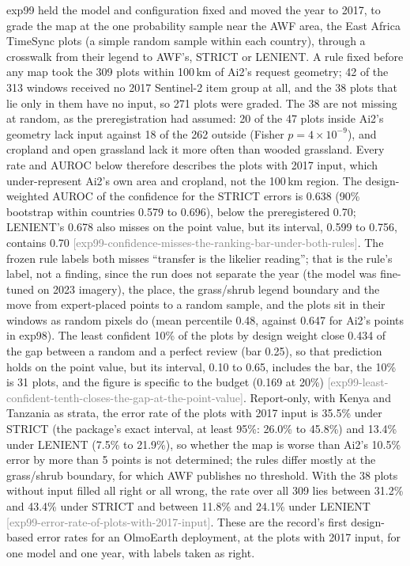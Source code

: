 \documentclass[11pt,a4paper]{article}
\newcommand{\claim}[1]{{\scriptsize\textsf{\textcolor{gray}{[#1]}}}}
\begin{document}
exp99 held the model and configuration fixed and moved the year to 2017, to grade the map at the one probability
sample near the AWF area, the East Africa TimeSync plots (a simple random sample within each country), through a
crosswalk from their legend to AWF's, STRICT or LENIENT. A rule fixed before any map took the 309 plots within 100\,km
of Ai2's request geometry; 42 of the 313 windows received no 2017 Sentinel-2 item group at all, and the 38 plots that
lie only in them have no input, so 271 plots were graded. The 38 are not missing at random, as the preregistration had assumed: 20 of the 47 plots inside Ai2's geometry
lack input against 18 of the 262 outside (Fisher $p = 4\times10^{-9}$), and cropland and open grassland lack it more
often than wooded grassland. Every rate and AUROC below therefore describes the plots with 2017 input, which under-represent Ai2's own area
and cropland, not the 100\,km region. The design-weighted AUROC of the confidence for the STRICT errors is 0.638 (90\%
bootstrap within countries 0.579 to 0.696), below the preregistered 0.70; LENIENT's 0.678 also misses on the point
value, but its interval, 0.599 to 0.756, contains 0.70 \claim{exp99-confidence-misses-the-ranking-bar-under-both-rules}.
The frozen rule labels both misses ``transfer is the likelier reading''; that is the rule's label, not a finding, since
the run does not separate the year (the model was fine-tuned on 2023 imagery), the place, the grass/shrub legend
boundary and the move from expert-placed points to a random sample, and the plots sit in their windows as random
pixels do (mean percentile 0.48, against 0.647 for Ai2's points in exp98). The least confident 10\% of the plots by
design weight close 0.434 of the gap between a random and a perfect review (bar 0.25), so that prediction holds on the
point value, but its interval, 0.10 to 0.65, includes the bar, the 10\% is 31 plots, and the figure is specific to
the budget (0.169 at 20\%) \claim{exp99-least-confident-tenth-closes-the-gap-at-the-point-value}. Report-only, with
Kenya and Tanzania as strata, the error rate of the plots with 2017 input is 35.5\% under STRICT (the package's exact
interval, at least 95\%: 26.0\% to 45.8\%) and 13.4\% under LENIENT (7.5\% to 21.9\%), so whether the map is worse than Ai2's 10.5\% error
by more than 5 points is not determined; the rules differ mostly at the grass/shrub boundary, for which AWF publishes
no threshold. With the 38 plots without input filled all right or all wrong, the rate over all 309 lies between
31.2\% and 43.4\% under STRICT and between 11.8\% and 24.1\% under LENIENT
\claim{exp99-error-rate-of-plots-with-2017-input}. These are the record's first design-based error rates for an
OlmoEarth deployment, at the plots with 2017 input, for one model and one year, with labels taken as right.
\end{document}
